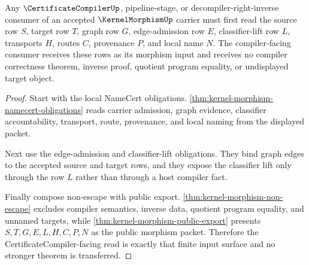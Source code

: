 \begin{theorem}
\label{thm:kernel-morphism-certificate-compiler-handoff}
Any $\CertificateCompilerUp$, pipeline-stage, or decompiler-right-inverse consumer of an accepted $\KernelMorphismUp$ carrier must first read the source row $S$, target row $T$, graph row $G$, edge-admission row $E$, classifier-lift row $L$, transports $H$, routes $C$, provenance $P$, and local name $N$. The compiler-facing consumer receives these rows as its morphism input and receives no compiler correctness theorem, inverse proof, quotient program equality, or undisplayed target object.
\end{theorem}
\begin{proof}
Start with the local NameCert obligations. \autoref{thm:kernel-morphism-namecert-obligations} reads carrier admission, graph evidence, classifier accountability, transport, route, provenance, and local naming from the displayed packet.

Next use the edge-admission and classifier-lift obligations. They bind graph edges to the accepted source and target rows, and they expose the classifier lift only through the row $L$ rather than through a host compiler fact.

Finally compose non-escape with public export. \autoref{thm:kernel-morphism-non-escape} excludes compiler semantics, inverse data, quotient program equality, and unnamed targets, while \autoref{thm:kernel-morphism-public-export} presents $S,T,G,E,L,H,C,P,N$ as the public morphism packet. Therefore the CertificateCompiler-facing read is exactly that finite input surface and no stronger theorem is transferred.
\end{proof}

